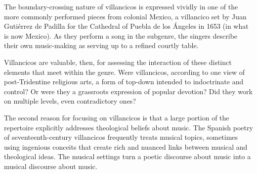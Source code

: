 The boundary-crossing nature of villancicos is expressed vividly in one of the 
more commonly performed pieces from colonial Mexico, a villancico set by Juan 
Gutiérrez de Padilla for the Cathedral of Puebla de los Ángeles in 1653 (in 
what is now Mexico).
As they perform a song in the  subgenre, the singers describe 
their own music-making as serving up  to a refined courtly 
table.

Villancicos are valuable, then, for assessing the interaction of these distinct 
elements that meet within the genre.
Were villancicos, according to one view of post-Tridentine religious arts, a 
form of top-down  intended to indoctrinate and control?
Or were they a grassroots expression of popular devotion?
Did they work on multiple levels, even contradictory ones?

The second reason for focusing on villancicos is that a large portion of the 
repertoire explicitly addresses theological beliefs about music.
The Spanish poetry of seventeenth-century villancicos frequently treats musical 
topics, sometimes using ingenious conceits that create rich and nuanced links 
between musical and theological ideas.
The musical settings turn a poetic discourse about music into a musical 
discourse about music.

